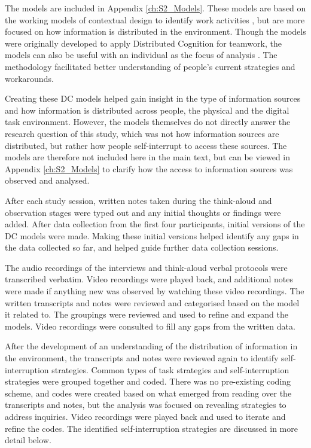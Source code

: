 The models are included in Appendix \ref{ch:S2_Models}. These models are based on the working models of contextual design to identify work activities \citep{Holtzblatt2014}, but are more focused on how information is distributed in the environment. Though the models were originally developed to apply Distributed Cognition for teamwork, the models can also be useful with an individual as the focus of analysis \citep{Furniss2006}. The methodology facilitated better understanding of people’s current strategies and workarounds.

Creating these DC models helped gain insight in the type of information sources and how information is distributed across people, the physical and the digital task environment. However, the models themselves do not directly answer the research question of this study, which was not how information sources are distributed, but rather how people self-interrupt to access these sources. The models are therefore not included here in the main text, but can be viewed in Appendix \ref{ch:S2_Models} to clarify how the access to information sources was observed and analysed.

After each study session, written notes taken during the think-aloud and observation stages were typed out and any initial thoughts or findings were added. After data collection from the first four participants, initial versions of the DC models were made. Making these initial versions helped identify any gaps in the data collected so far, and helped guide further data collection sessions. 

The audio recordings of the interviews and think-aloud verbal protocols were transcribed verbatim. Video recordings were played back, and additional notes were made if anything new was observed by watching these video recordings. The written transcripts and notes were reviewed and categorised based on the model it related to. The groupings were reviewed and used to refine and expand the models. Video recordings were consulted to fill any gaps from the written data.


After the development of an understanding of the distribution of information in the environment, the transcripts and notes were reviewed again to identify self-interruption strategies. Common types of task strategies and self-interruption strategies were grouped together and coded. There was no pre-existing coding scheme, and codes were created based on what emerged from reading over the transcripts and notes, but the analysis was focused on revealing strategies to address inquiries. Video recordings were played back and used to iterate and refine the codes. The identified self-interruption strategies are discussed in more detail below. 

